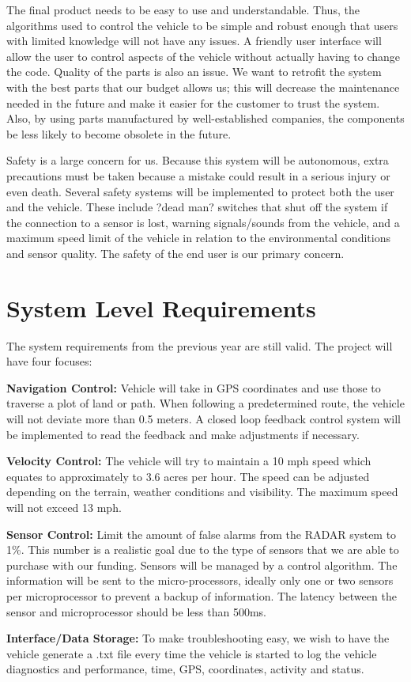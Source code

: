The final product needs to be easy to use and understandable.  Thus, the algorithms used to control the vehicle to be simple and robust enough that users with limited knowledge will not have any issues.   A friendly user interface will allow the user to control aspects of the vehicle without actually having to change the code.  Quality of the parts is also an issue.  We want to retrofit the system with the best parts that our budget allows us; this will decrease the maintenance needed in the future and make it easier for the customer to trust the system.  Also, by using parts manufactured by well-established companies, the components be less likely to become obsolete in the future. 

    Safety is a large concern for us.  Because this system will be autonomous, extra precautions must be taken because a mistake could result in a serious injury or even death. Several safety systems will be implemented to protect both the user and the vehicle.  These include ?dead man? switches that shut off the system if the connection to a sensor is lost, warning signals/sounds from the vehicle, and a maximum speed limit of the vehicle in relation to the environmental conditions and sensor quality.  The safety of the end user is our primary concern.

\section{System Level Requirements}
	The system requirements from the previous year are still valid.  The project will have four focuses:
	
\begin{compactitem}
	\item {\bf Navigation Control:} Vehicle will take in GPS coordinates and use those to traverse a plot of land or path.  When following a predetermined route, the vehicle will not deviate more than 0.5 meters.  A closed loop feedback control system will be implemented to read the feedback and make adjustments if necessary.
	\item {\bf Velocity Control:} The vehicle will try to maintain a 10 mph speed which equates to approximately to 3.6 acres per hour.  The speed can be adjusted depending on the terrain, weather conditions and visibility. The maximum speed will not exceed 13 mph.
	\item {\bf Sensor Control:} Limit the amount of false alarms from the RADAR system to 1\%. This number is a realistic goal due to the type of sensors that we are able to purchase with our funding.   Sensors will be managed by a control algorithm.  The information will be sent to the micro-processors, ideally only one or two sensors per microprocessor to prevent a backup of information.  The latency between the sensor and microprocessor should be less than 500ms.
	\item {\bf Interface/Data Storage:} To make troubleshooting easy, we wish to have the vehicle generate a .txt file every time the vehicle is started to log the vehicle diagnostics and performance, time, GPS, coordinates, activity and status.  
\end{compactitem}

